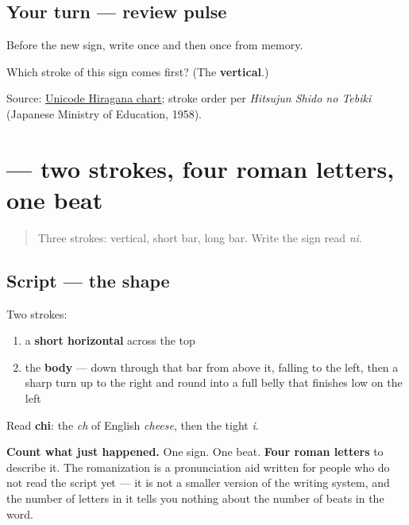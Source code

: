 \subsection*{Your turn — review pulse}
Before the new sign, write \textbf{} once and then \textbf{} once from memory.

\begin{tcolorbox}[breakable,colback=teal!4,colframe=teal!35!black,title={Before you move on}]
Which stroke of this sign comes first? (The \textbf{vertical}.)

Source: \href{https://www.unicode.org/charts/PDF/U3040.pdf}{Unicode Hiragana chart}; stroke order per \emph{Hitsujun Shido no Tebiki} (Japanese Ministry of Education, 1958).
\end{tcolorbox}
\section[\texorpdfstring{\ja{ち} (chi)}{ち (chi)}]{ — two strokes, four roman letters, one beat}

\label{lesson:JA-W01-chi}



\begin{quote}
Three strokes: vertical, short bar, long bar. Write the sign read \emph{ni}.
\end{quote}

\subsection*{Script — the shape}

\begin{quote}
\end{quote}

Two strokes:

\begin{enumerate}
\raggedright
  \item a \textbf{short horizontal} across the top
  \item the \textbf{body} — down through that bar from above it, falling to the left, then a sharp turn up to the right and round into a full belly that finishes low on the left
\end{enumerate}

Read \textbf{chi}: the \emph{ch} of English \emph{cheese}, then the tight \emph{i}.

\textbf{Count what just happened.} One sign. One beat. \textbf{Four roman letters} to describe it. The romanization is a pronunciation aid written for people who do not read the script yet — it is not a smaller version of the writing system, and the number of letters in it tells you nothing about the number of beats in the word.

